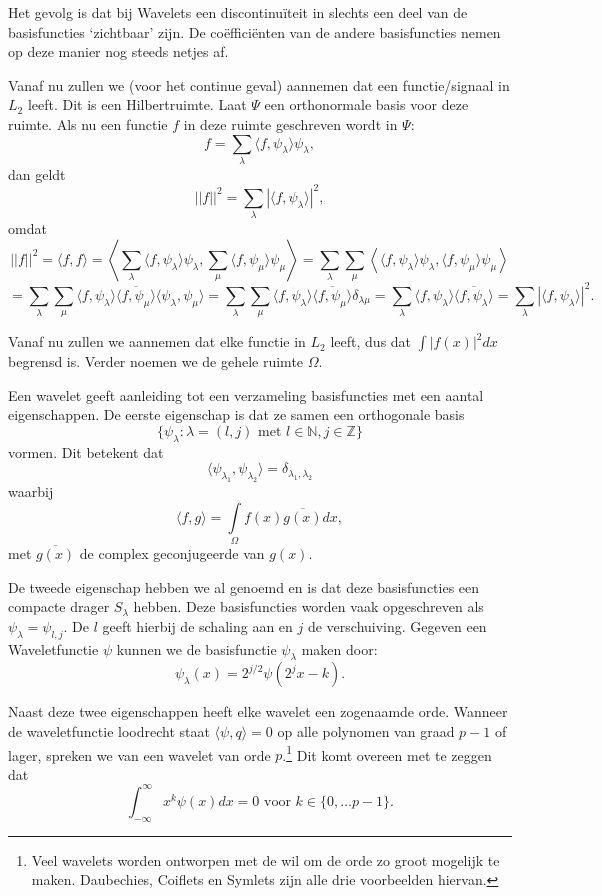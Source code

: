 \documentclass[11pt]{amsart}
\newcommand{\N}{\mathbb{N}}
\newcommand{\Z}{\mathbb{Z}}
\begin{document}
Het gevolg is dat bij Wavelets een discontinu\"iteit in slechts een deel van de basisfuncties `zichtbaar' zijn. De co\"effici\"enten van de andere basisfuncties nemen op deze manier nog steeds netjes af.

Vanaf nu zullen we (voor het continue geval) aannemen dat een functie/signaal in $L_2$ leeft. Dit is een Hilbertruimte. Laat $\Psi$ een orthonormale basis voor deze ruimte. Als nu een functie $f$ in deze ruimte geschreven wordt in $\Psi$:
\[
f = \sum_{\lambda} \langle f, \psi_\lambda \rangle \psi_\lambda,
\]
dan geldt
\[
||f||^2 = \sum_{\lambda} | \langle f, \psi_\lambda \rangle |^2,
\]
omdat
\[
||f||^2 = \langle f, f \rangle = \left\langle \sum_{\lambda} \langle f, \psi_\lambda \rangle \psi_\lambda, \sum_{\mu} \langle f, \psi_\mu \rangle \psi_\mu \right\rangle = \sum_{\lambda} \sum_{\mu} \left\langle \langle f, \psi_\lambda \rangle \psi_\lambda, \langle f, \psi_\mu \rangle \psi_\mu \right \rangle
\]
\[
 = \sum_\lambda \sum_\mu \langle f, \psi_\lambda \rangle \overline{\langle f, \psi_\mu \rangle}\langle \psi_\lambda, \psi_\mu \rangle = \sum_\lambda \sum_\mu \langle f, \psi_\lambda \rangle \overline{\langle f, \psi_\mu \rangle} \delta_{\lambda \mu} = \sum_\lambda \langle f, \psi_\lambda \rangle \overline{\langle f, \psi_\lambda \rangle} = \sum_\lambda |\langle f, \psi_\lambda \rangle |^2.
\]

Vanaf nu zullen we aannemen dat elke functie in $L_2$ leeft, dus dat $\int |f(x)|^2 dx$ begrensd is. Verder noemen we de gehele ruimte $\Omega$.

Een wavelet geeft aanleiding tot een verzameling basisfuncties met een aantal eigenschappen. De eerste eigenschap is dat ze samen een orthogonale basis
\[
\{ \psi_\lambda: \lambda = (l,j)\text{ met } l \in \N,j \in \Z \}\]
 vormen. Dit betekent dat 
\[
\langle \psi_{\lambda_1}, \psi_{\lambda_2} \rangle = \delta_{\lambda_1, \lambda_2}
\]
 waarbij 
\[
\langle f, g\rangle = \underset{\Omega}{\int} f(x) \overline{g(x)} dx,
\]
met $\overline{g(x)}$ de complex geconjugeerde van $g(x)$.

De tweede eigenschap hebben we al genoemd en is dat deze basisfuncties een compacte drager $S_\lambda$ hebben. Deze basisfuncties worden vaak opgeschreven als $\psi_\lambda = \psi_{l,j}$. De $l$ geeft hierbij de schaling aan en $j$ de verschuiving. Gegeven een Waveletfunctie $\psi$ kunnen we de basisfunctie $\psi_\lambda$ maken door:
\[
	\psi_\lambda(x) = 2^{j/2} \psi(2^jx - k).
\]

Naast deze twee eigenschappen heeft elke wavelet een zogenaamde orde. Wanneer de waveletfunctie loodrecht staat $\langle \psi, q\rangle = 0$ op alle polynomen van graad $p-1$ of lager, spreken we van een wavelet van orde $p$.\footnote{Veel wavelets worden ontworpen met de wil om de orde zo groot mogelijk te maken. Daubechies, Coiflets en Symlets zijn alle drie voorbeelden hiervan.} Dit komt overeen met te zeggen dat
\[
	\int_{-\infty}^\infty x^k \psi(x) dx = 0 \text{ voor } k \in \{ 0, \ldots p-1 \}.
\]
\end{document}
